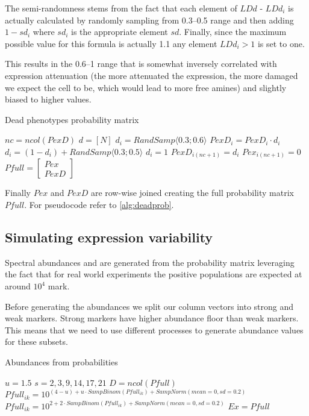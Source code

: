   The semi-randomness stems from the fact that each element of $LDd$ - $LDd_i$ is actually calculated by randomly sampling from 0.3--0.5 range and then adding $1-sd_i$ where $sd_i$ is the appropriate element $sd$. Finally, since the maximum possible value for this formula is actually 1.1 any element $LDd_i>1$ is set to one. 
  
  This results in the 0.6--1 range that is somewhat inversely correlated with expression attenuation (the more attenuated the expression, the more damaged we expect the cell to be, which would lead to more free amines) and slightly biased to higher values.
  \begin{algorithm}
  \caption{Dead phenotypes probability matrix}\label{alg:deadprob}
  \begin{algorithmic}
  \State $nc = ncol(PexD)$
  \State $d = [N]$
  \State $d_i = RandSamp\langle0.3;0.6\rangle$
  \State $PexD_i = PexD_i \cdot d_i$
  \State $d_i = (1-d_i)+RandSamp\langle0.3;0.5\rangle$
  \State $d_i=1$
  \EndIf
  \State $PexD_{i(nc+1)}=d_i$
  \State $Pex_{i(nc+1)}=0$
  \EndFor 
  \State $Pfull=\left[ \begin{array} {c} Pex \\ PexD\end{array}\right]$
  \end{algorithmic}
  \end{algorithm}
  Finally $Pex$ and $PexD$ are row-wise joined creating the full probability matrix $Pfull$. For pseudocode refer to \cref{alg:deadprob}.

  
  \subsection{Simulating expression variability}
  Spectral abundances and are generated from the probability matrix leveraging the fact that for real world experiments the positive populations are expected at around $10^4$ mark.
  
  Before generating the abundances we split our column vectors into strong and weak markers. Strong markers have higher abundance floor than weak markers. This means that we need to use different processes to generate abundance values for these subsets. 
  
  \begin{algorithm}
  \caption{Abundances from probabilities}\label{alg:abund}
  \begin{algorithmic}
  \State $u = 1.5$
  \State $s = {2,3,9,14,17,21}$
  \State $D = ncol(Pfull)$
  \State $Pfull_{ik}=10^{(4-u)+u\cdot SampBinom(Pfull_{ik})+SampNorm(mean=0,sd=0.2)}$
  \Else
  \State$Pfull_{ik}=10^{2+2\cdot SampBinom(Pfull_{ik})+SampNorm(mean=0,sd=0.2)}$
  \EndIf
  \EndFor 
  \EndFor 
  \State $Ex=Pfull$
  \end{algorithmic}
  \end{algorithm}
  
